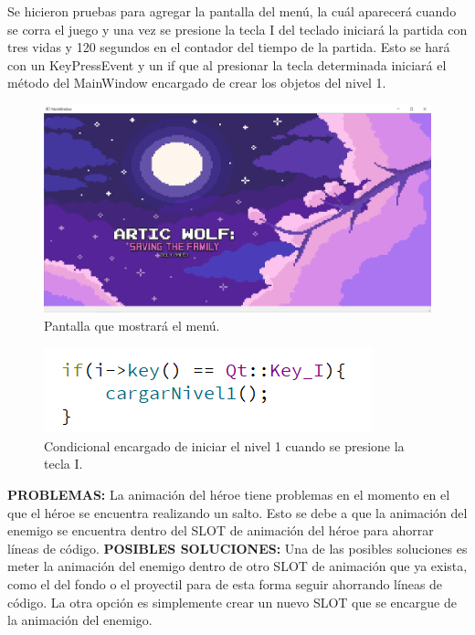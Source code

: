 \documentclass{article}
\begin{document}
Se hicieron pruebas para agregar la pantalla del menú, la cuál aparecerá cuando se corra el juego y una vez se presione la tecla I del teclado iniciará la partida con tres vidas y 120 segundos en el contador del tiempo de la partida. Esto se hará con un KeyPressEvent y un if que al presionar la tecla determinada iniciará el método del MainWindow encargado de crear los objetos del nivel 1.

\begin{figure}[h]
\includegraphics[scale=0.4]{Images/pantallainicio.png}
\centering
\caption{Pantalla que mostrará el menú.}
\label{fig:pantallamenu}
\end{figure}

\newpage
\begin{figure}[h]
\includegraphics[scale=1]{Images/keyi.png}
\centering
\caption{Condicional encargado de iniciar el nivel 1 cuando se presione la tecla I.}
\label{fig:if}
\end{figure}

 \textbf{PROBLEMAS:} La animación del héroe tiene problemas en el momento en el que el héroe se encuentra realizando un salto. Esto se debe a que la animación del enemigo se encuentra dentro del SLOT de animación del héroe para ahorrar líneas de código.
 \newline
 \textbf{POSIBLES SOLUCIONES: }Una de las posibles soluciones es meter la animación del enemigo dentro de otro SLOT de animación que ya exista, como el del fondo o el proyectil para de esta forma seguir ahorrando líneas de código. La otra opción es simplemente crear un nuevo SLOT que se encargue de la animación del enemigo.
 \newline
 
\end{document}

